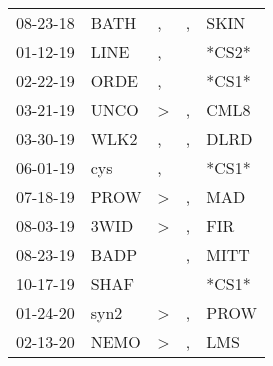 \begin{supertabular}{p{0.07\textwidth}p{0.06\textwidth}p{0.02\textwidth}p{0.02\textwidth}p{0.06\textwidth}}
          08-23-18\textsuperscript{} &           BATH\textsuperscript{} &                , &                , &           SKIN\textsuperscript{} \\
          01-12-19\textsuperscript{} &           LINE\textsuperscript{} &                , &                  &                            *CS2* \\
          02-22-19\textsuperscript{} &           ORDE\textsuperscript{} &                , &                  &                            *CS1* \\
          03-21-19\textsuperscript{} &           UNCO\textsuperscript{} &     \textgreater &                , &           CML8\textsuperscript{} \\
          03-30-19\textsuperscript{} &           WLK2\textsuperscript{} &                , &                , &           DLRD\textsuperscript{} \\
          06-01-19\textsuperscript{} &            cys\textsuperscript{} &                , &                  &                            *CS1* \\
          07-18-19\textsuperscript{} &           PROW\textsuperscript{} &     \textgreater &                , &            MAD\textsuperscript{} \\
          08-03-19\textsuperscript{} &           3WID\textsuperscript{} &     \textgreater &                , &            FIR\textsuperscript{} \\
          08-23-19\textsuperscript{} &           BADP\textsuperscript{} &                  &                , &           MITT\textsuperscript{} \\
          10-17-19\textsuperscript{} &           SHAF\textsuperscript{} &                  &                  &                            *CS1* \\
          01-24-20\textsuperscript{} &           syn2\textsuperscript{} &     \textgreater &                , &           PROW\textsuperscript{} \\
          02-13-20\textsuperscript{} &           NEMO\textsuperscript{} &     \textgreater &                , &            LMS\textsuperscript{} \\
\end{supertabular}
